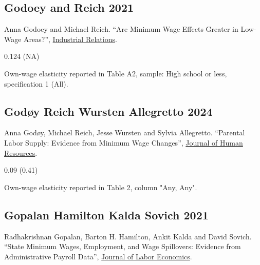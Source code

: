 \subsection*{Godoey and Reich 2021}
\vspace{-0.7em}

\noindent Anna Godoey and Michael Reich. ``Are Minimum Wage Effects Greater in Low-Wage Areas?'', \href{https://doi.org/10.1111/irel.12267}{Industrial Relations}.

\vspace{0.7em}

 0.124 (NA)

\vspace{0.7em}

 Own-wage elasticity reported in Table A2, sample: High school or less, specification 1 (All).

\subsection*{Godøy Reich Wursten Allegretto 2024}
\vspace{-0.7em}

\noindent Anna Godøy, Michael Reich, Jesse Wursten and Sylvia Allegretto. ``Parental Labor Supply: Evidence from Minimum Wage Changes'', \href{https://doi.org/10.3368/jhr.1119-10540R2}{Journal of Human Resources}.

\vspace{0.7em}

 0.09 (0.41)

\vspace{0.7em}

 Own-wage elasticity reported in Table 2, column "Any, Any".

\subsection*{Gopalan Hamilton Kalda Sovich 2021}
\vspace{-0.7em}

\noindent Radhakrishnan Gopalan, Barton H. Hamilton, Ankit Kalda and David Sovich. ``State Minimum Wages, Employment, and Wage Spillovers: Evidence from Administrative Payroll Data'', \href{https://doi.org/10.1086/711355}{Journal of Labor Economics}.

\vspace{0.7em}

